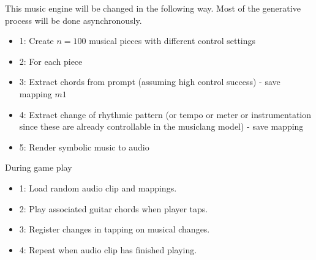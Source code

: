 This music engine will be changed in the following way. Most of the generative process will be done asynchronously.
\begin{itemize}
    \item{1}: Create $n=100$ musical pieces with different control settings
    \item{2}: For each piece
    \item{3}: Extract chords from prompt (assuming high control success) - save mapping $m1$
    \item{4}: Extract change of rhythmic pattern (or tempo or meter or instrumentation since these are already controllable in the musiclang model) - save mapping
    \item{5}: Render symbolic music to audio
\end{itemize}

During game play
\begin{itemize}
    \item{1}: Load random audio clip and mappings.
    \item{2}: Play associated guitar chords when player taps.
    \item{3}: Register changes in tapping on musical changes.
    \item{4}: Repeat when audio clip has finished playing.
\end{itemize}

